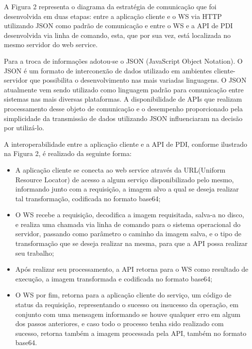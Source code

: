 \documentclass[12pt]{article}
\begin{document}
A Figura 2 representa o diagrama da estratégia de comunicação que
foi desenvolvida em duas etapas: entre a aplicação cliente e o WS via HTTP utilizando JSON como padrão de comunicação e entre
o WS e a API de PDI desenvolvida via linha de comando, esta, que por sua vez, está localizada no mesmo servidor do web service.

Para a troca de informações adotou-se o JSON (JavaScript Object Notation). O
JSON é um formato de interconexão de dados utilizado em ambientes cliente-servidor
que possibilita o desenvolvimento nas mais variadas linguagens. O JSON atualmente
vem sendo utilizado como linguagem padrão para comunicação entre sistemas nas mais
diversas plataformas. A disponibilidade de APIs que realizam processamento desse objeto de comunicação e o desempenho proporcionado
pela simplicidade da transmissão de dados utilizando JSON influenciaram na decisão
por utilizá-lo.

A interoperabilidade entre a aplicação cliente e a API de PDI, conforme ilustrado na Figura 2, é
realizado da seguinte forma:
\begin{itemize}
	\item A aplicação cliente se conecta ao web service através da URL(Uniform Resource Locator) de acesso a algum serviço disponibilizado pelo mesmo, informando junto com a requisição, a imagem alvo a qual se deseja realizar tal transformação, codificada no formato base64;
	\item O WS recebe a requisição, decodifica a imagem requisitada, salva-a no disco, e realiza uma chamada via linha de comando para o sistema operacional do servidor, passando como parâmetro o caminho da imagem salva, e o tipo de transformação que se deseja realizar na mesma, para que a API possa realizar seu trabalho;
	\item Após realizar seu processamento, a API retorna para o WS como resultado de execução, a imagem transformada e codificada no formato base64;
	\item O WS por fim, retorna para a aplicação cliente do serviço, um código de status da requisição, representando o sucesso ou insucesso da operação, em conjunto com uma mensagem informando se houve qualquer erro em algum dos passos anteriores, e caso todo o processo tenha sido realizado com sucesso, retorna também a imagem processada pela API, também no formato base64.
\end{itemize}
\end{document}
